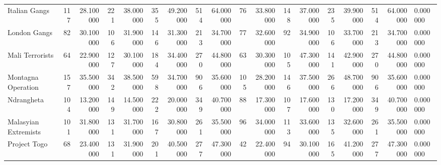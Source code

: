\begin{tabular}{lrrrrrrrrrrrrrrrrl}
Italian Gangs & 117 & 28.100000 & 221 & 38.000000 & 355 & 49.200000 & 514 & 64.000000 & 76 & 33.800000 & 148 & 37.000000 & 235 & 39.900000 & 514 & 64.000000 & 0.000000 \\
London Gangs & 82 & 30.100000 & 106 & 31.900000 & 146 & 31.300000 & 213 & 34.700000 & 77 & 32.600000 & 92 & 34.900000 & 106 & 33.700000 & 213 & 34.700000 & 0.000000 \\
Mali Terrorists & 64 & 22.900000 & 127 & 30.100000 & 184 & 34.400000 & 270 & 44.800000 & 63 & 30.300000 & 105 & 47.300000 & 141 & 42.900000 & 270 & 44.800000 & 0.000000 \\
Montagna Operation & 157 & 35.500000 & 342 & 38.500000 & 598 & 34.700000 & 906 & 35.600000 & 105 & 28.200000 & 146 & 37.500000 & 266 & 48.700000 & 906 & 35.600000 & 0.000000 \\
Ndrangheta & 104 & 13.200000 & 149 & 14.500000 & 222 & 20.000000 & 349 & 40.700000 & 88 & 17.300000 & 107 & 17.600000 & 130 & 17.200000 & 349 & 40.700000 & 0.000000 \\
Malasyian Extremists & 101 & 31.800000 & 131 & 31.700000 & 167 & 30.800000 & 261 & 35.500000 & 96 & 34.000000 & 113 & 33.600000 & 135 & 32.600000 & 261 & 35.500000 & 0.000000 \\
Project Togo & 68 & 23.400000 & 131 & 31.900000 & 201 & 40.500000 & 277 & 47.300000 & 42 & 22.400000 & 94 & 30.100000 & 165 & 41.200000 & 277 & 47.300000 & 0.000000 \\
\end{tabular}

